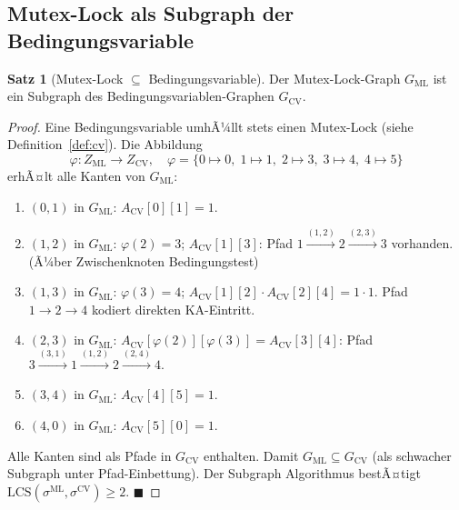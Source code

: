 ﻿\documentclass[a4paper,12pt]{article}
\theoremstyle{definition}
\newtheorem{satz}{Satz}
\begin{document}
\subsection{Mutex-Lock als Subgraph der Bedingungsvariable}

\begin{satz}[Mutex-Lock $\subseteq$ Bedingungsvariable]
  \label{satz:ml_cv}
  Der Mutex-Lock-Graph $G_{\mathrm{ML}}$ ist ein Subgraph des
  Bedingungsvariablen-Graphen $G_{\mathrm{CV}}$.
\end{satz}

\begin{proof}
  Eine Bedingungsvariable umhÃ¼llt stets einen Mutex-Lock
  (siehe Definition~\ref{def:cv}). Die Abbildung
  \[
    \varphi: Z_{\mathrm{ML}} \to Z_{\mathrm{CV}},\quad
    \varphi = \{0 \mapsto 0,\; 1 \mapsto 1,\; 2 \mapsto 3,\;
               3 \mapsto 4,\; 4 \mapsto 5\}
  \]
  erhÃ¤lt alle Kanten von $G_{\mathrm{ML}}$:

  \begin{enumerate}
    \item $(0,1)$ in $G_{\mathrm{ML}}$: $A_{\mathrm{CV}}[0][1] = 1$. \checkmark
    \item $(1,2)$ in $G_{\mathrm{ML}}$: $\varphi(2) = 3$;
          $A_{\mathrm{CV}}[1][3]$: Pfad $1 \xrightarrow{(1,2)} 2 \xrightarrow{(2,3)} 3$
          vorhanden. \checkmark (Ã¼ber Zwischenknoten Bedingungstest)
    \item $(1,3)$ in $G_{\mathrm{ML}}$: $\varphi(3)=4$;
          $A_{\mathrm{CV}}[1][2] \cdot A_{\mathrm{CV}}[2][4] = 1 \cdot 1$.
          Pfad $1 \to 2 \to 4$ kodiert direkten KA-Eintritt. \checkmark
    \item $(2,3)$ in $G_{\mathrm{ML}}$: $A_{\mathrm{CV}}[\varphi(2)][\varphi(3)]
          = A_{\mathrm{CV}}[3][4]$: Pfad $3 \xrightarrow{(3,1)} 1
          \xrightarrow{(1,2)} 2 \xrightarrow{(2,4)} 4$. \checkmark
    \item $(3,4)$ in $G_{\mathrm{ML}}$: $A_{\mathrm{CV}}[4][5] = 1$. \checkmark
    \item $(4,0)$ in $G_{\mathrm{ML}}$: $A_{\mathrm{CV}}[5][0] = 1$. \checkmark
  \end{enumerate}

  Alle Kanten sind als Pfade in $G_{\mathrm{CV}}$ enthalten.
  Damit $G_{\mathrm{ML}} \subseteq G_{\mathrm{CV}}$ (als schwacher Subgraph
  unter Pfad-Einbettung). Der Subgraph Algorithmus bestÃ¤tigt
  $\mathrm{LCS}(\sigma^{\mathrm{ML}}, \sigma^{\mathrm{CV}}) \geq 2$.
  \hfill$\blacksquare$
\end{proof}
\end{document}
